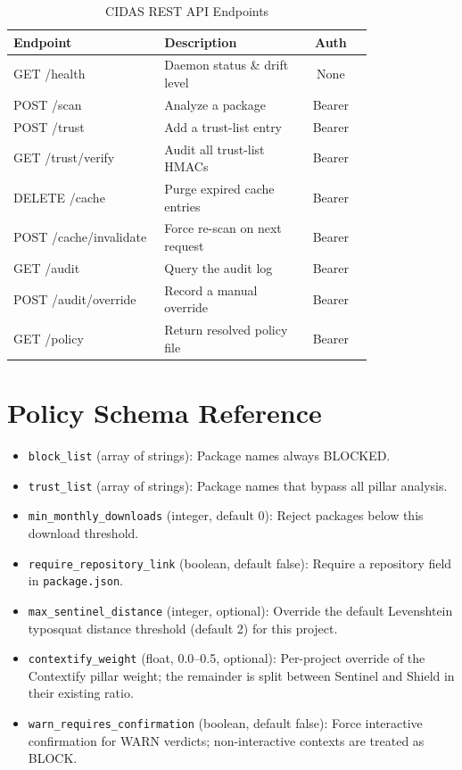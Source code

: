 \documentclass[journal]{IEEEtran}
\begin{document}
\begin{table}[h]
\caption{CIDAS REST API Endpoints}
\label{tab:api}
\centering
\begin{tabular}{@{}p{0.42\linewidth}p{0.38\linewidth}c@{}}
\toprule
\textbf{Endpoint} & \textbf{Description} & \textbf{Auth} \\
\midrule
GET /health              & Daemon status \& drift level      & None \\
POST /scan                & Analyze a package                 & Bearer \\
POST /trust                & Add a trust-list entry            & Bearer \\
GET /trust/verify         & Audit all trust-list HMACs        & Bearer \\
DELETE /cache              & Purge expired cache entries       & Bearer \\
POST /cache/invalidate     & Force re-scan on next request     & Bearer \\
GET /audit                & Query the audit log               & Bearer \\
POST /audit/override       & Record a manual override          & Bearer \\
GET /policy                & Return resolved policy file       & Bearer \\
\bottomrule
\end{tabular}
\end{table}

\section{Policy Schema Reference}
\begin{itemize}
\item \texttt{block\_list} (array of strings): Package names always BLOCKED.
\item \texttt{trust\_list} (array of strings): Package names that bypass all pillar analysis.
\item \texttt{min\_monthly\_downloads} (integer, default 0): Reject packages below this download threshold.
\item \texttt{require\_repository\_link} (boolean, default false): Require a repository field in
\texttt{package.json}.
\item \texttt{max\_sentinel\_distance} (integer, optional): Override the default Levenshtein typosquat
distance threshold (default 2) for this project.
\item \texttt{contextify\_weight} (float, 0.0--0.5, optional): Per-project override of the Contextify pillar
weight; the remainder is split between Sentinel and Shield in their existing ratio.
\item \texttt{warn\_requires\_confirmation} (boolean, default false): Force interactive confirmation for WARN
verdicts; non-interactive contexts are treated as BLOCK.
\end{itemize}
\end{document}
